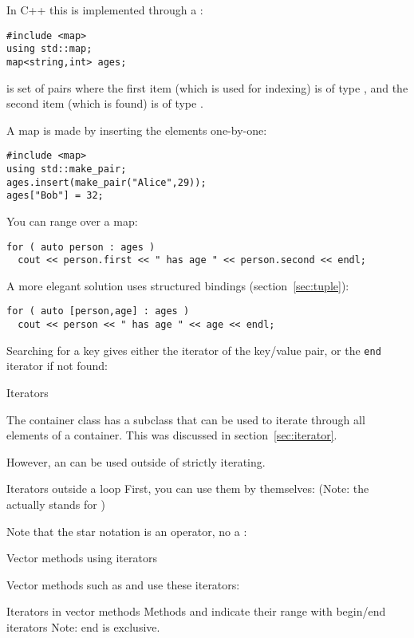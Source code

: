 In C++ this is implemented through a :
\begin{lstlisting}
#include <map>
using std::map;
map<string,int> ages;
\end{lstlisting}
is set of
pairs where the first item (which is used for indexing) is of type
, and the second item (which is found) is of type .

A map is made by inserting the elements one-by-one:
\begin{lstlisting}
#include <map>
using std::make_pair;
ages.insert(make_pair("Alice",29));
ages["Bob"] = 32;
\end{lstlisting}

You can range over a map:
\begin{lstlisting}
for ( auto person : ages )
  cout << person.first << " has age " << person.second << endl;
\end{lstlisting}
A more elegant solution uses structured bindings (section~\ref{sec:tuple}):
\begin{lstlisting}
for ( auto [person,age] : ages )
  cout << person << " has age " << age << endl;
\end{lstlisting}

Searching for a key gives either the iterator of the key/value pair,
or the \lstinline{end} iterator if not found:
%

 {Iterators}
\label{sec:iterator-class}

The container class has a subclass  that can be
used to iterate through all elements of a container. This was
discussed in section~\ref{sec:iterator}.

However, an  can be used outside of strictly iterating.
\begin{block}{Iterators outside a loop}
  \label{sl:vec-iterator}
  First, you can use them by themselves:
  (Note: the  actually stands for )
\end{block}

Note that the star notation is an operator, no a
:
%

 {Vector methods using iterators}

Vector methods such as  and  use
these iterators:
\begin{block}{Iterators in vector methods}
  \label{sl:vec-erase}
  Methods  and  indicate their range with begin/end
  iterators
  Note: end is exclusive.
\end{block}

